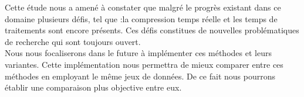 \documentclass[a4paper,oneside,12pt]{report}
\theoremstyle{definition}
\begin{document}
	Cette étude nous a amené à constater que malgré le progrès existant dans ce domaine plusieurs défis, tel que :la compression temps réelle et les temps de traitements sont encore présents. Ces défis constitues de nouvelles problématiques de recherche qui sont toujours ouvert.\\
	
	Nous nous focaliserons dans le future à implémenter ces méthodes et leurs variantes. Cette implémentation nous permettra de mieux comparer entre ces méthodes en employant le même jeux de données. De ce fait nous pourrons établir une comparaison plus objective entre eux.

\pagestyle{plain}
\newpage


\end{document}
